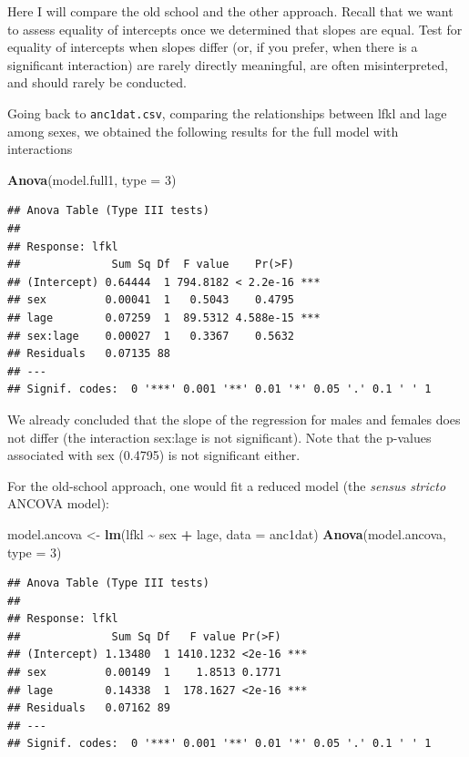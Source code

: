 \documentclass[
  12pt,
]{book}
\newenvironment{Shaded}{\begin{snugshade}}{\end{snugshade}}
\newcommand{\DataTypeTok}[1]{\textcolor[rgb]{0.13,0.29,0.53}{#1}}
\newcommand{\DecValTok}[1]{\textcolor[rgb]{0.00,0.00,0.81}{#1}}
\newcommand{\KeywordTok}[1]{\textcolor[rgb]{0.13,0.29,0.53}{\textbf{#1}}}
\newcommand{\NormalTok}[1]{#1}
\newcommand{\OperatorTok}[1]{\textcolor[rgb]{0.81,0.36,0.00}{\textbf{#1}}}
\newcommand{\StringTok}[1]{\textcolor[rgb]{0.31,0.60,0.02}{#1}}
\begin{document}
Here I will compare the old school and the other approach. Recall that we want to assess equality of intercepts once we determined that slopes are equal. Test for equality of intercepts when slopes differ (or, if you prefer, when there is a significant interaction) are rarely directly meaningful, are often misinterpreted, and should rarely be conducted.

Going back to \texttt{anc1dat.csv}, comparing the relationships between lfkl and lage among sexes, we obtained the following results for the full model with interactions

\begin{Shaded}
\begin{Highlighting}[]
\KeywordTok{Anova}\NormalTok{(model.full1, }\DataTypeTok{type =} \DecValTok{3}\NormalTok{)}
\end{Highlighting}
\end{Shaded}

\begin{verbatim}
## Anova Table (Type III tests)
## 
## Response: lfkl
##              Sum Sq Df  F value    Pr(>F)    
## (Intercept) 0.64444  1 794.8182 < 2.2e-16 ***
## sex         0.00041  1   0.5043    0.4795    
## lage        0.07259  1  89.5312 4.588e-15 ***
## sex:lage    0.00027  1   0.3367    0.5632    
## Residuals   0.07135 88                       
## ---
## Signif. codes:  0 '***' 0.001 '**' 0.01 '*' 0.05 '.' 0.1 ' ' 1
\end{verbatim}

We already concluded that the slope of the regression for males and females does not differ (the interaction sex:lage is not significant). Note that the p-values associated with sex (0.4795) is not significant either.

For the old-school approach, one would fit a reduced model (the \emph{sensus stricto} ANCOVA model):

\begin{Shaded}
\begin{Highlighting}[]
\NormalTok{model.ancova \textless{}{-}}\StringTok{ }\KeywordTok{lm}\NormalTok{(lfkl }\OperatorTok{\textasciitilde{}}\StringTok{ }\NormalTok{sex }\OperatorTok{+}\StringTok{ }\NormalTok{lage, }\DataTypeTok{data =}\NormalTok{ anc1dat)}
\KeywordTok{Anova}\NormalTok{(model.ancova, }\DataTypeTok{type =} \DecValTok{3}\NormalTok{)}
\end{Highlighting}
\end{Shaded}

\begin{verbatim}
## Anova Table (Type III tests)
## 
## Response: lfkl
##              Sum Sq Df   F value Pr(>F)    
## (Intercept) 1.13480  1 1410.1232 <2e-16 ***
## sex         0.00149  1    1.8513 0.1771    
## lage        0.14338  1  178.1627 <2e-16 ***
## Residuals   0.07162 89                     
## ---
## Signif. codes:  0 '***' 0.001 '**' 0.01 '*' 0.05 '.' 0.1 ' ' 1
\end{verbatim}
\end{document}
